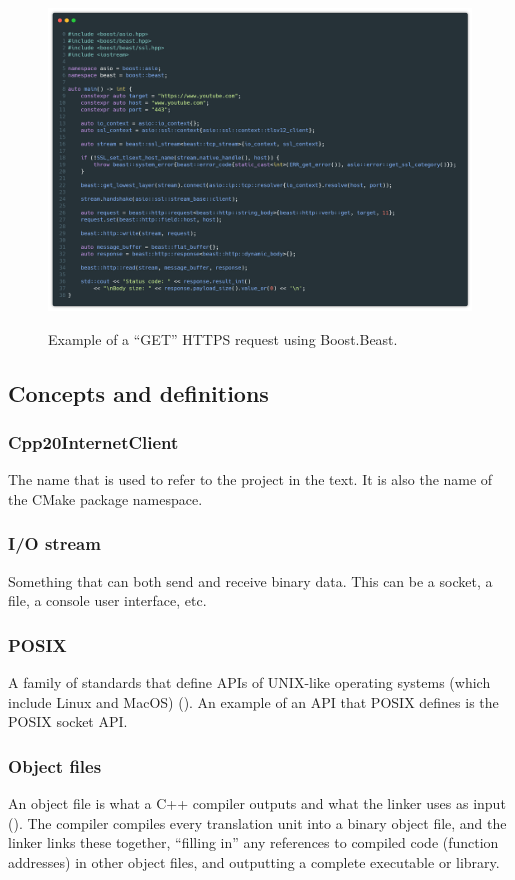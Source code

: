 \documentclass[12pt, a4paper]{article}
\begin{document}
\begin{figure}[hp]
	\centering
	\caption{Example of a “GET” HTTPS request using Boost.Beast.}
	\includegraphics[width=\textwidth]{boost_beast_example}
	\label{fig:boost_beast_example}
\end{figure}

\clearpage
\subsection{Concepts and definitions}
\subsubsection{Cpp20InternetClient}
The name that is used to refer to the project in the text. It is also the name of the CMake package namespace.

\subsubsection{I/O stream}
Something that can both send and receive binary data. This can be a socket, a file, a console user interface, etc.

\subsubsection{POSIX}
A family of standards that define APIs of UNIX-like operating systems (which include Linux and MacOS) (\cite{Posix}). An example of an API that POSIX defines is the POSIX socket API.

\subsubsection{Object files}
An object file is what a C++ compiler outputs and what the linker uses as input (\cite{UnderstandingCompilation}). The compiler compiles every translation unit into a binary object file, and the linker links these together, “filling in” any references to compiled code (function addresses) in other object files, and outputting a complete executable or library.
\end{document}
